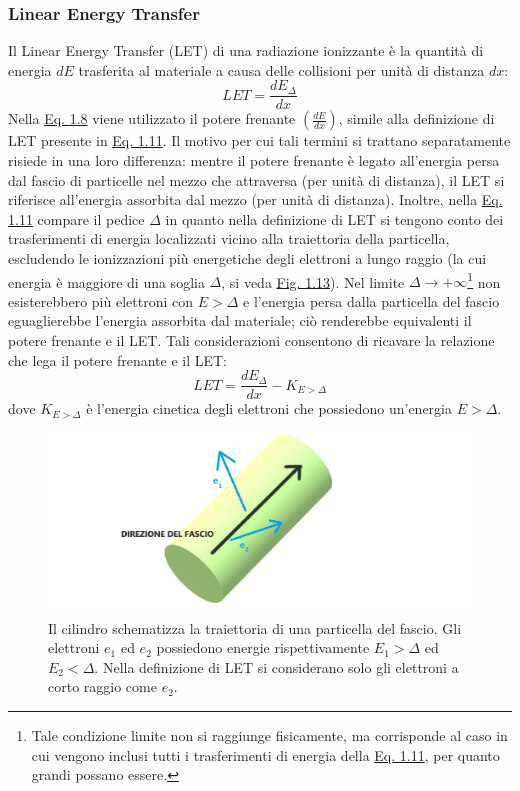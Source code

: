 \documentclass[12pt,a4paper,twoside]{report}
\begin{document}
	\subsubsection{Linear Energy Transfer}\label{par:let}
	Il Linear Energy Transfer (LET) di una radiazione ionizzante è la quantità di energia $dE$ trasferita al materiale a causa delle collisioni per unità di distanza $dx$:
	\begin{equation}
		LET=\frac{dE_\Delta}{dx}
		\label{eq:let}
	\end{equation}
	Nella \hyperref[eq:dose_as]{Eq. 1.8} viene utilizzato il potere frenante $\left(\frac{dE}{dx}\right)$, simile alla definizione di LET presente in \hyperref[eq:let]{Eq. 1.11}. Il motivo per cui tali termini si trattano separatamente risiede in una loro differenza: mentre il potere frenante è legato all'energia persa dal fascio di particelle nel mezzo che attraversa (per unità di distanza), il LET si riferisce all'energia assorbita dal mezzo (per unità di distanza). Inoltre, nella \hyperref[eq:let]{Eq. 1.11} compare il pedice $\Delta$ in quanto nella definizione di LET si tengono conto dei trasferimenti di energia localizzati vicino alla traiettoria della particella, escludendo le ionizzazioni più energetiche degli elettroni a lungo raggio (la cui energia è maggiore di una soglia $\Delta$, si veda \hyperref[fig:let]{Fig. 1.13}). Nel limite $\Delta\rightarrow+\infty$\footnote{Tale condizione limite non si raggiunge fisicamente, ma corrisponde al caso in cui vengono inclusi tutti i trasferimenti di energia della \hyperref[eq:let]{Eq. 1.11}, per quanto grandi possano essere.} non esisterebbero più elettroni con $E>\Delta$ e l'energia persa dalla particella del fascio eguaglierebbe l'energia assorbita dal materiale; ciò renderebbe equivalenti il potere frenante e il LET. Tali considerazioni consentono di ricavare la relazione che lega il potere frenante e il LET:
	\begin{equation}
		LET=\frac{dE_\Delta}{dx}-K_{E>\Delta}
		\label{eq:let&stoppingpower}
	\end{equation}
	dove $K_{E>\Delta}$ è l'energia cinetica degli elettroni che possiedono un'energia $E>\Delta$.
	\begin{figure}[H]
		\centering
		\includegraphics[width=0.72\linewidth]{let.jpg}
		\caption{Il cilindro schematizza la traiettoria di una particella del fascio. Gli elettroni $e_1$ ed $e_2$ possiedono energie rispettivamente $E_1>\Delta$ ed $E_2<\Delta$. Nella definizione di LET si considerano solo gli elettroni a corto raggio come $e_2$.}
		\label{fig:let}
	\end{figure}
\end{document}

